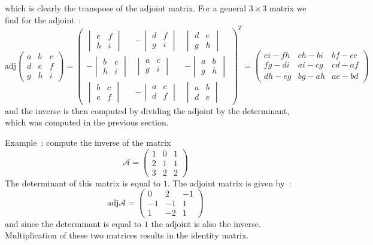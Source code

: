 which is clearly the transpose of the adjoint matrix.  For a general $3\times 3$ matrix we find for the adjoint~:
\begin{equation}
\mbox{adj}\begin{pmatrix}a&b&c\\ d&e&f\\ g&h&i\end{pmatrix}=
\begin{pmatrix}\begin{vmatrix}e&f\\ h&i\end{vmatrix}&-\begin{vmatrix}d&f\\ g&i\end{vmatrix} & \begin{vmatrix}d&e\\ g&h\end{vmatrix}\\
                        -\begin{vmatrix}b&c\\ h&i\end{vmatrix}&\begin{vmatrix}a&c\\ g&i\end{vmatrix} &-\begin{vmatrix}a&b\\ g&h\end{vmatrix}\\
                         \begin{vmatrix}b&c\\ e&f\end{vmatrix}&-\begin{vmatrix}a&c\\ d&f\end{vmatrix}&\begin{vmatrix}a&b\\ d&e\end{vmatrix}\end{pmatrix}^{T}
=\begin{pmatrix}ei-fh&ch-bi&bf-ce\\ fg-di&ai-cg&cd-af\\ dh-eg&bg-ah&ae-bd\end{pmatrix}\nonumber
\end{equation}
and the inverse is then computed by dividing the adjoint by the determinant, which was computed in the 
previous section.

Example~: compute the inverse of the matrix
\[
\mathcal{A}=\begin{pmatrix}1&0&1\\ 2&1&1\\ 3&2&2\end{pmatrix}
\]
The determinant of this matrix is equal to $1$.  The adjoint matrix is given by~:
\[
\mbox{adj}\mathcal{A}=\begin{pmatrix}0&2&-1\\ -1&-1&1\\ 1&-2&1\end{pmatrix}
\]
and since the determinant is equal to $1$ the adjoint is also the inverse.  Multiplication of these two matrices 
results in the identity matrix.

